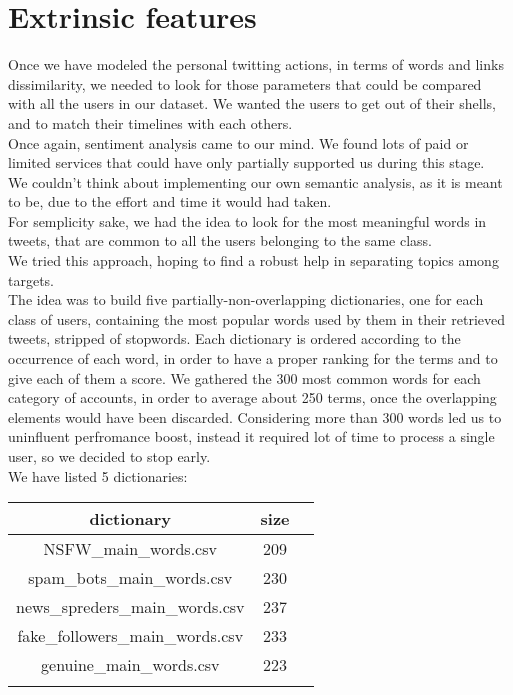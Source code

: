 \section{Extrinsic features}
Once we have modeled the personal twitting actions, in terms of words and links dissimilarity, we needed to look for those parameters that could be compared with all the users in our dataset.
We wanted the users to get out of their shells, and to match their timelines with each others.\\
Once again, sentiment analysis came to our mind. We found lots of paid or limited services that could have only partially supported us during this stage.\\
We couldn't think about implementing our own semantic analysis, as it is meant to be, due to the effort and time it would had taken.\\
For semplicity sake, we had the idea to look for the most meaningful words in tweets, that are common to all the users belonging to the same class.\\
We tried this approach, hoping to find a robust help in separating topics among targets.\\
The idea was to build five partially-non-overlapping dictionaries, one for each class of users, containing the most popular words used by them in their retrieved tweets, stripped of stopwords. Each dictionary is ordered according to the occurrence of each word, in order to have a proper ranking for the terms and to give each of them a score.
We gathered the 300 most common words for each category of accounts, in order to average about 250 terms, once the overlapping elements would have been discarded.
Considering more than 300 words led us to uninfluent perfromance boost, instead it required lot of time to process a single user, so we decided to stop early.\\
We have listed 5 dictionaries: 
\small
\begin{center}
	\begin{tabular}{ccc}
		\\dictionary&size\\
		\hline\hline
		NSFW\_main\_words.csv&209\\
		spam\_bots\_main\_words.csv&230\\
		news\_spreders\_main\_words.csv&237\\
		fake\_followers\_main\_words.csv&233\\
		genuine\_main\_words.csv&223\\\hline\\
	\end{tabular}
\end{center}
